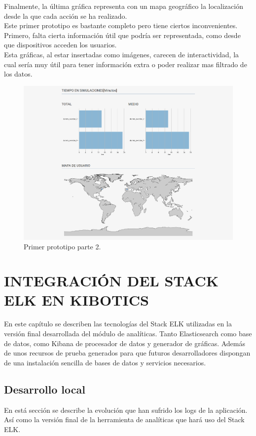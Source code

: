 \documentclass[11pt,a4paper]{book}
\begin{document}
		Finalmente, la última gráfica representa con un mapa geográfico la localización desde la que cada acción se ha realizado.\\
		
		Este primer prototipo es bastante completo pero tiene ciertos inconvenientes. Primero, falta cierta información útil que podría ser representada, como desde que dispositivos acceden los usuarios.\\
		
		Esta gráficas, al estar insertadas como imágenes, carecen de interactividad, la cual sería muy útil para tener información extra o poder realizar mas filtrado de los datos.
		\begin{figure}[H]
			\centering
			\includegraphics[width=14cm, keepaspectratio]{img/primer_prototipo_2.png}
			\caption{Primer prototipo parte 2.}
			\label{fig:primer_prototipo_2}
		\end{figure}
	
	
	\chapter{INTEGRACIÓN DEL STACK ELK EN KIBOTICS}
		En este capítulo se describen las tecnologías del Stack ELK utilizadas en la versión final desarrollada del módulo de analíticas. Tanto Elasticsearch como base de datos, como Kibana de procesador de datos y generador de gráficas. Además de unos recursos de prueba generados para que futuros desarrolladores dispongan de una instalación sencilla de bases de datos y servicios necesarios.
		\section{Desarrollo local}
			En está sección se describe la evolución que han sufrido los logs de la aplicación. Así como la versión final de la herramienta de analíticas que hará uso del Stack ELK.
\end{document}
